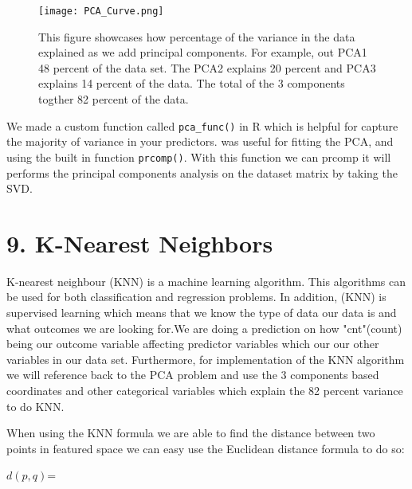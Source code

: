\documentclass[
]{article}
\begin{document}
\begin{figure}
\centering
\texttt{[image: PCA\_Curve.png]}
\caption{This figure showcases how percentage of the variance in the data explained as we add principal components. For example, out PCA1 48 percent of the data set. The PCA2 explains 20 percent and PCA3 explains 14 percent of the data. The total of the 3 components togther 82 percent of the data.}
\end{figure}

We made a custom function called \texttt{pca\_func()} in R which is helpful for capture the majority of variance in your predictors.\color{black} was useful for fitting the PCA, and using the built in function \texttt{prcomp()}. With this function we can prcomp it will performs the principal components analysis on the dataset matrix by taking the SVD.


\hypertarget{k-Nearest Neighbors}{%
\section{9. K-Nearest Neighbors }\label{k-Nearest Neighbors}}
K-nearest neighbour (KNN) is a machine learning algorithm. This algorithms can be used for both classification and regression problems. In addition, (KNN) is supervised learning which means that we know the type of data our data is and what outcomes we are looking for.We are doing a prediction on how "cnt"(count) being our outcome variable affecting predictor variables which our our other variables in our data set. Furthermore, for implementation of the KNN algorithm we will reference back to the PCA problem and use the 3 components based coordinates and other categorical variables which explain the 82 percent variance to do KNN.

When using the KNN formula we are able to find the distance between two points in featured space we can easy use the Euclidean distance formula to do so:

$d(p,q)$= 

\newpage
\end{document}
